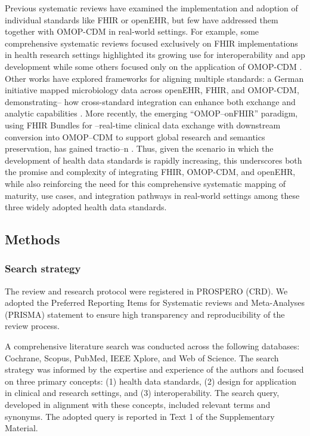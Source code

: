 Previous systematic reviews have examined the implementation and adoption of individual standards like FHIR or openEHR, but few have addressed them together with OMOP-CDM in real-world settings. For example, some comprehensive systematic reviews focused exclusively on FHIR implementations in health research settings highlighted its growing use for interoperability and app development \cite{vorisek_fast_2022,kapitan_data_2025,ayaz_fast_2021} while some others focused only on the application of OMOP-CDM \cite{ahmadi_omop_2022,henke_conceptual_2024}. Other works have explored frameworks for aligning multiple standards: a German initiative mapped microbiology data across openEHR, FHIR, and OMOP-CDM, demonstrating-- how cross-standard integration can enhance both exchange and analytic capabilities \cite{rinaldi_from_2021}. More recently, the emerging ``OMOP--onFHIR'' paradigm, using FHIR Bundles for --real-time clinical data exchange with downstream conversion into OMOP--CDM to support global research and semantics preservation, has gained tractio--n \cite{jayathissa_omop-on-fhir_2025}. Thus, given the scenario in which the development of health data standards is rapidly increasing, this underscores both the promise and complexity of integrating FHIR, OMOP-CDM, and openEHR, while also reinforcing the need for this comprehensive systematic mapping of maturity, use cases, and integration pathways in real-world settings among these three widely adopted health data standards.

\subsection{Methods}
\label{sec:paper1_methods}

\subsubsection{Search strategy}
\label{sec:paper1_search_strategy}

The review and research protocol were registered in PROSPERO (CRD). We adopted the Preferred Reporting Items for Systematic reviews and Meta-Analyses (PRISMA) statement \cite{page_prisma_2021} to ensure high transparency and reproducibility of the review process.

A comprehensive literature search was conducted across the following databases: Cochrane, Scopus, PubMed, IEEE Xplore, and Web of Science. The search strategy was informed by the expertise and experience of the authors and focused on three primary concepts: (1) health data standards, (2) design for application in clinical and research settings, and (3) interoperability. The search query, developed in alignment with these concepts, included relevant terms and synonyms. The adopted query is reported in Text 1 of the Supplementary Material.

